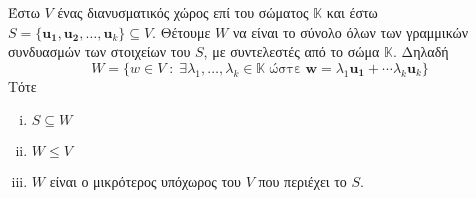 \begin{thm}
    Έστω $ V $ ένας διανυσματικός χώρος επί του σώματος $ \mathbb{K} $ και έστω 
    $ S = \{ \mathbf{u_{1}}, \mathbf{u_{2}}, \ldots, \mathbf{u}_{k}\} \subseteq V $.
    Θέτουμε $ W $ να είναι το σύνολο όλων των γραμμικών συνδυασμών των στοιχείων του 
    $S$, με συντελεστές από το σώμα $ \mathbb{K} $.  Δηλαδή 
    \[
        W = \{ w \in V \; : \; \exists \lambda _{1}, \ldots, \lambda _{k} \in 
            \mathbb{K} \; \text{ώστε} \; \mathbf{w} = \lambda _{1} 
            \mathbf{u_{1}}+ \cdots \lambda _{k} \mathbf{u}_{k}\} 
    \] 
    Τότε
    \begin{enumerate}[i)]
        \item $ S \subseteq W $
        \item $ W \leq V $ 
        \item $ W $ είναι ο μικρότερος υπόχωρος του $V$ που περιέχει το $S$.
    \end{enumerate}
\end{thm}
